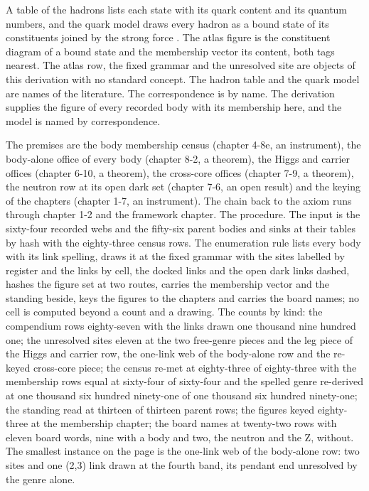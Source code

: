 \begin{chbridge}
A table of the hadrons lists each state with its quark content and its quantum numbers, and the quark model draws every hadron as a bound state of its constituents joined by the strong force \cite{GellMann1964,Zweig1964}.
The atlas figure is the constituent diagram of a bound state and the membership vector its content, both tags nearest. The atlas row, the fixed grammar and the unresolved site are objects of this derivation with no standard concept. The hadron table and the quark model are names of the literature. The correspondence is by name. The derivation supplies the figure of every recorded body with its membership here, and the model is named by correspondence.
\end{chbridge}
\begin{chproof}[instrument]
The premises are the body membership census (chapter 4-8e, an instrument), the body-alone office of every body (chapter 8-2, a theorem), the Higgs and carrier offices (chapter 6-10, a theorem), the cross-core offices (chapter 7-9, a theorem), the neutron row at its open dark set (chapter 7-6, an open result) and the keying of the chapters (chapter 1-7, an instrument). The chain back to the axiom runs through chapter 1-2 and the framework chapter. The procedure. The input is the sixty-four recorded webs and the fifty-six parent bodies and sinks at their tables by hash with the eighty-three census rows. The enumeration rule lists every body with its link spelling, draws it at the fixed grammar with the sites labelled by register and the links by cell, the docked links and the open dark links dashed, hashes the figure set at two routes, carries the membership vector and the standing beside, keys the figures to the chapters and carries the board names; no cell is computed beyond a count and a drawing. The counts by kind: the compendium rows eighty-seven with the links drawn one thousand nine hundred one; the unresolved sites eleven at the two free-genre pieces and the leg piece of the Higgs and carrier row, the one-link web of the body-alone row and the re-keyed cross-core piece; the census re-met at eighty-three of eighty-three with the membership rows equal at sixty-four of sixty-four and the spelled genre re-derived at one thousand six hundred ninety-one of one thousand six hundred ninety-one; the standing read at thirteen of thirteen parent rows; the figures keyed eighty-three at the membership chapter; the board names at twenty-two rows with eleven board words, nine with a body and two, the neutron and the Z, without. The smallest instance on the page is the one-link web of the body-alone row: two sites and one (2,3) link drawn at the fourth band, its pendant end unresolved by the genre alone.


\end{chproof}
